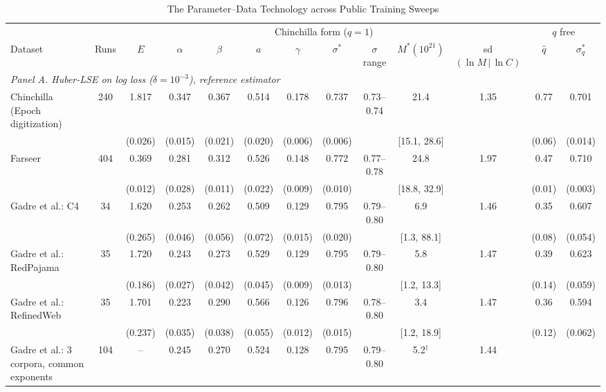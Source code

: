 \begin{landscape}
\begin{table}[!htbp]
\centering
\footnotesize
\caption{The Parameter--Data Technology across Public Training Sweeps}
\label{tab:technology}
\begin{threeparttable}
\begin{tabular}{lcccccccccccc}
\toprule
& & \multicolumn{9}{c}{Chinchilla form ($q=1$)} & \multicolumn{2}{c}{$q$ free} \\
\cmidrule(lr){3-11}\cmidrule(lr){12-13}
Dataset & Runs & $E$ & $\alpha$ & $\beta$ & $a$ & $\gamma$ & $\sigma^*$ & $\sigma$ range & $M^*(10^{21})$ & sd$(\ln M\,|\,\ln C)$ & $\hat q$ & $\sigma^*_q$ \\
\midrule
\multicolumn{13}{l}{\textit{Panel A. Huber-LSE on log loss ($\delta=10^{-3}$), reference estimator}} \\
Chinchilla (Epoch digitization) & 240 & 1.817 & 0.347 & 0.367 & 0.514 & 0.178 & 0.737 & 0.73--0.74 & 21.4 & 1.35 & 0.77 & 0.701 \\
 &  & (0.026) & (0.015) & (0.021) & (0.020) & (0.006) & (0.006) &  & [15.1, 28.6] &  & (0.06) & (0.014) \\[2pt]
Farseer & 404 & 0.369 & 0.281 & 0.312 & 0.526 & 0.148 & 0.772 & 0.77--0.78 & 24.8 & 1.97 & 0.47 & 0.710 \\
 &  & (0.012) & (0.028) & (0.011) & (0.022) & (0.009) & (0.010) &  & [18.8, 32.9] &  & (0.01) & (0.003) \\[2pt]
Gadre et al.: C4 & 34 & 1.620 & 0.253 & 0.262 & 0.509 & 0.129 & 0.795 & 0.79--0.80 & 6.9 & 1.46 & 0.35 & 0.607 \\
 &  & (0.265) & (0.046) & (0.056) & (0.072) & (0.015) & (0.020) &  & [1.3, 88.1] &  & (0.08) & (0.054) \\[2pt]
Gadre et al.: RedPajama & 35 & 1.720 & 0.243 & 0.273 & 0.529 & 0.129 & 0.795 & 0.79--0.80 & 5.8 & 1.47 & 0.39 & 0.623 \\
 &  & (0.186) & (0.027) & (0.042) & (0.045) & (0.009) & (0.013) &  & [1.2, 13.3] &  & (0.14) & (0.059) \\[2pt]
Gadre et al.: RefinedWeb & 35 & 1.701 & 0.223 & 0.290 & 0.566 & 0.126 & 0.796 & 0.78--0.80 & 3.4 & 1.47 & 0.36 & 0.594 \\
 &  & (0.237) & (0.035) & (0.038) & (0.055) & (0.012) & (0.015) &  & [1.2, 18.9] &  & (0.12) & (0.062) \\[2pt]
Gadre et al.: 3 corpora, common exponents & 104 & -- & 0.245 & 0.270 & 0.524 & 0.128 & 0.795 & 0.79--0.80 & 5.2$^\dagger$ & 1.44 &  &  \\

\end{tabular}
\end{threeparttable}
\end{table}
\end{landscape}
